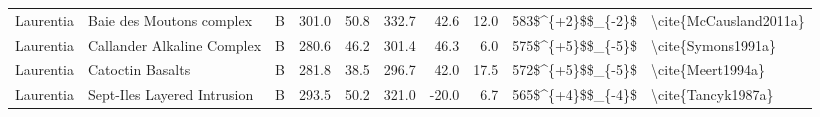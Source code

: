 \begin{longtable}{p{1 in}p{1 in}rrrrrrr}
                     Laurentia &                           Baie des Moutons complex &      B &     301.0 &      50.8 & 332.7 &  42.6 &      12.0 &      583\$\textasciicircum \{+2\}\$\$\_\{-2\}\$ &                             \textbackslash cite\{McCausland2011a\} \\
                     Laurentia &                         Callander Alkaline Complex &      B &     280.6 &      46.2 & 301.4 &  46.3 &       6.0 &      575\$\textasciicircum \{+5\}\$\$\_\{-5\}\$ &                                 \textbackslash cite\{Symons1991a\} \\
                     Laurentia &                                   Catoctin Basalts &      B &     281.8 &      38.5 & 296.7 &  42.0 &      17.5 &      572\$\textasciicircum \{+5\}\$\$\_\{-5\}\$ &                                  \textbackslash cite\{Meert1994a\} \\
                     Laurentia &                        Sept-Iles Layered Intrusion &      B &     293.5 &      50.2 & 321.0 & -20.0 &       6.7 &      565\$\textasciicircum \{+4\}\$\$\_\{-4\}\$ &                                 \textbackslash cite\{Tancyk1987a\} \\
\end{longtable}
